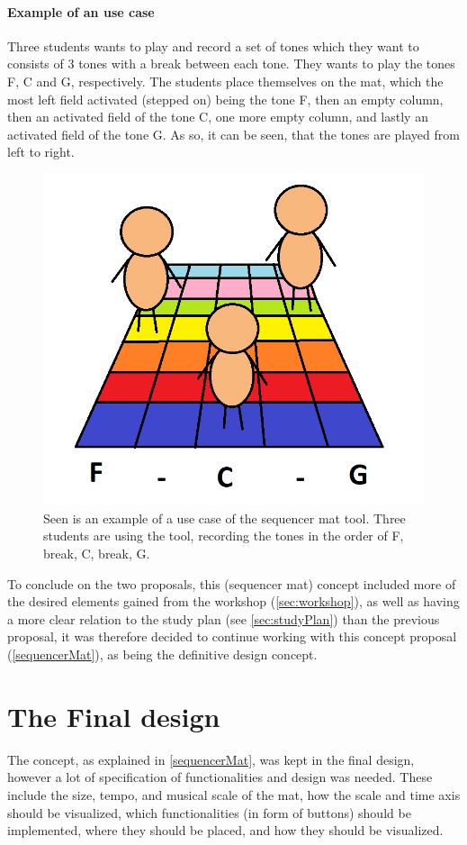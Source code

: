 \paragraph{Example of an use case}
Three students wants to play and record a set of tones which they want to consists of 3 tones with a break between each tone. They wants to play the tones F, C and G, respectively. The students place themselves on the mat, which the most left field activated (stepped on) being the tone F, then an empty column, then an activated field of the tone C, one more empty column, and lastly an activated field of the tone G. As so, it can be seen, that the tones are played from left to right.   
\begin{figure}[H]
	\centering
	\includegraphics[width=0.7\linewidth]{figure/Design/UseCase} 
	\caption{Seen is an example of a use case of the sequencer mat tool. Three students are using the tool, recording the tones in the order of F, break, C, break, G. }
	\label{fig:UseCase2}
\end{figure}
  

To conclude on the two proposals, this (sequencer mat) concept included more of the desired elements gained from the workshop (\autoref{sec:workshop}), as well as having a more clear relation to the study plan (see \autoref{sec:studyPlan}) than the previous proposal,
it was therefore decided to continue working with this concept proposal (\autoref{sequencerMat}), as being the definitive design concept. 

\section{The Final design}\label{designConcept}
The concept, as explained in \autoref{sequencerMat}, was kept in the final design, however a lot of specification of functionalities and design was needed. These include the size, tempo, and musical scale of the mat, how the scale and time axis should be visualized, which functionalities (in form of buttons) should be implemented, where they should be placed, and how they should be visualized. 


